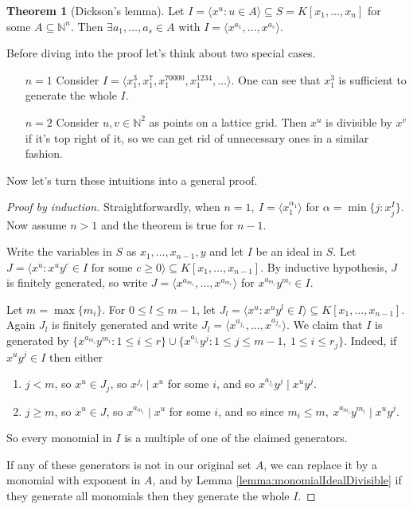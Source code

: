 \documentclass[a4paper]{article}
\newcommand{\la}{\langle}
\newcommand{\ra}{\rangle}
\theoremstyle{definition}
\newtheorem{thm}[defn]{Theorem}
\begin{document}
\begin{thm}[Dickson's lemma]
Let $I=\la x^u:u\in A\ra \subseteq S=K[x_1,\ldots,x_n]$ for some $A\subseteq \mathbb N^n$. Then $\exists a_1,\ldots,a_s\in A$ with $I=\la x^{a_1},\ldots,x^{a_s} \ra$.
\end{thm}
Before diving into the proof let's think about two special cases.
\begin{itemize}
\item[$n=1$] Consider $I=\la x_1^3,x_1^7,x_1^{70000},x_1^{1234},\ldots\ra$. One can see that $x_1^3$ is sufficient to generate the whole $I$.
\item[$n=2$] Consider $u,v\in\mathbb N^2$ as points on a lattice grid. Then $x^u$ is divisible by $x^v$ if it's top right of it, so we can get rid of unnecessary ones in a similar fashion.
\end{itemize}
Now let's turn these intuitions into a general proof.
\begin{proof}[Proof by induction]
Straightforwardly, when $n=1,\ I=\la x_1^{\alpha_1}\ra$ for $\alpha=\min \{j:x_j^I \}$. Now assume $n>1$ and the theorem is true for $n-1$.

Write the variables in $S$ as $x_1,\ldots,x_{n-1},y$ and let $I$ be an ideal in $S$. Let $J=\la x^u:x^uy^c\in I\text{ for some }c\geq 0\ra\subseteq K[x_1,\ldots,x_{n-1}]$. By inductive hypothesis, $J$ is finitely generated, so write $J=\la x^{a_{m_1}}, \ldots, x^{a_{m_r}}\ra $ for $x^{a_{m_i}}y^{m_i}\in I$.

Let $m=\max \{m_i\}$. For $0\leq l\leq m-1$, let $J_l=\la x^u:x^u y^l\in I\ra\subseteq K[x_1,\ldots,x_{n-1}]$. Again $J_l$ is finitely generated and write $J_l=\la x^{a_{j_1}},\ldots,x^{a_{j_{r_l}}}\ra$. We claim that $I$ is generated by $\{x^{a_{m_i}} y^{m_i}:1\leq i\leq r\} \cup \{x^{a_{j_i}}y^{j} : 1\leq j\leq m-1,\ 1\leq i\leq r_j\}$. Indeed, if $x^u y^j\in I$ then either
\begin{enumerate}
\item $j<m$, so $x^u\in J_j$, so  $x^{j_i} \mid x^u$ for some $i$, and so $x^{a_{j_i}} y^j\mid x^u y^j$.
\item $j\geq m$, so $x^u\in J$, so $x^{a_{m_i}} \mid x^u$ for some $i$, and so since $m_i\leq m,\ x^{a_{m_i}} y^{m_i}\mid x^u y^j$.
\end{enumerate}
So every monomial in $I$ is a multiple of one of the claimed generators.

If any of these generators is not in our original set $A$, we can replace it by a monomial with exponent in $A$, and by Lemma \ref{lemma:monomialIdealDivisible} if they generate all monomials then they generate the whole $I$.
\end{proof}
\end{document}
